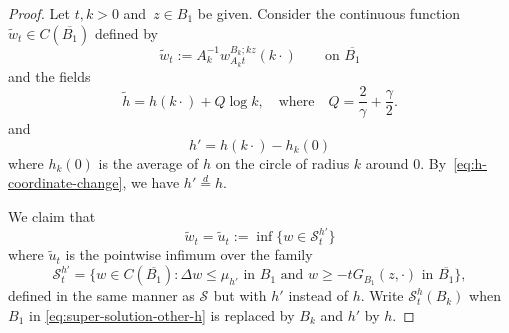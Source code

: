 \documentclass[12pt]{amsart}
\numberwithin{equation}{section}
\newcommand{\mclS}[2]{\hyperref[eq:super-solutions]{\mathcal{S}^{#1}_{#2}}}
\newcommand{\lss}[2]{\hyperref[eq:least-super-solution]{w^{#1}_{#2}}}
\begin{document}
	\begin{proof}
		Let $t, k > 0$ and~$z \in B_1$ be given.
		Consider the continuous function $\tilde{w}_t \in C(\overline{B_1})$ defined by 
		\begin{equation} \label{eq:definition-of-tildewt}
		\tilde{w}_{t} := A_k^{-1} \lss{B_{k}; k z}{A_k t}(k\cdot) \qquad \mbox{on $\overline{B_1}$}
		\end{equation}
		and the fields
		\begin{equation}
		\tilde{h} = h(k \cdot) + Q \log k, \quad \mbox{where} \quad Q = \frac{2}{\gamma} + \frac{\gamma}{2}.
		\end{equation}
		and
		\begin{equation}
		h' = h(k \cdot) - h_k(0)
		\end{equation}
		where $h_k(0)$ is the average of $h$ on the circle of radius $k$ around 0. By~\eqref{eq:h-coordinate-change}, we have $h' \overset{d}{=} h$. 
		
		We claim that
		\begin{equation}
		\tilde{w}_{t} = \tilde{u}_t := \inf\{ w \in \mathcal{S}^{h'}_t\}
		\end{equation}
		where $\tilde{u}_t$ is the pointwise infimum over the family
		\begin{equation} \label{eq:super-solution-other-h}
		\mathcal{S}^{h'}_t  = \{ w \in C(\overline{B_1}) :  \Delta w \leq \mu_{h'} \mbox{ in $B_1$}  \mbox{ and }  w \geq  -t G_{B_1}(z, \cdot) \mbox{ in $\overline{B_1}$}\},
		\end{equation}
		defined in the same manner as $\mclS{}{}$ but with $h'$ instead of $h$. Write $\mathcal{S}^h_{t}(B_{k})$ when $B_1$ in \eqref{eq:super-solution-other-h} is replaced by $B_{k}$ and $h'$ by $h$. 
		

\end{proof}
\end{document}
